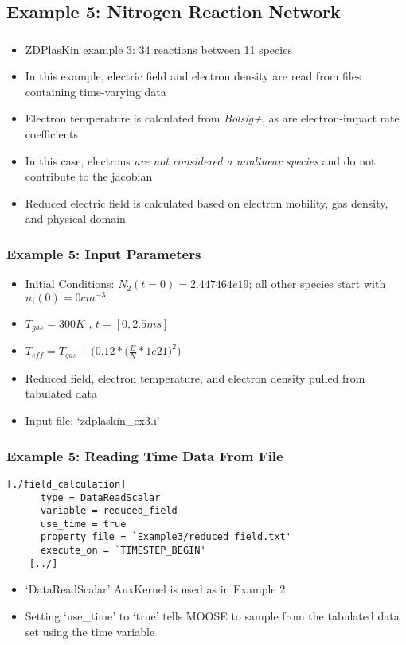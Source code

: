 \subsection{Example 5: Nitrogen Reaction Network}
\begin{frame}[fragile]
	\frametitle{\insertsubsectionhead}
	\begin{itemize}
		\item ZDPlasKin example 3: 34 reactions between 11 species \footnotemark
		\item In this example, electric field and electron density are read from files containing time-varying data
		\item Electron temperature is calculated from \textit{Bolsig+}, as are electron-impact rate coefficients
		\item In this case, electrons \textit{are not considered a nonlinear species} and do not contribute to the jacobian
		\item Reduced electric field is calculated based on electron mobility, gas density, and physical domain
	\end{itemize}
\end{frame}




\begin{frame}[fragile]
	\frametitle{Example 5: Input Parameters}
	\begin{itemize}
		\item Initial Conditions: $N_2(t=0) = 2.447464e19$; all other species start with $n_i(0) = 0 cm^{-3}$
		\item $T_{gas} = 300 K$ , $t=[0,2.5 ms]$
		\item $T_{eff} = T_{gas}+\Big(0.12 * \Big(\tfrac{E}{N}*1e21 \Big)^2 \Big)$
		\item Reduced field, electron temperature, and electron density pulled from tabulated data 
		\item Input file: `zdplaskin\_ex3.i'
	\end{itemize}
\end{frame}

\begin{frame}[fragile]
	\frametitle{Example 5: Reading Time Data From File}
	\begin{Verbatim}[fontsize=\scriptsize]
    [./field_calculation]
      type = DataReadScalar
      variable = reduced_field
      use_time = true
      property_file = `Example3/reduced_field.txt'
      execute_on = `TIMESTEP_BEGIN'
    [../]
	\end{Verbatim}
	\begin{itemize}
		\item `DataReadScalar' AuxKernel is used as in Example 2
		\item Setting `use\_time' to `true' tells MOOSE to sample from the tabulated data set using the time variable
	\end{itemize}
\end{frame}

